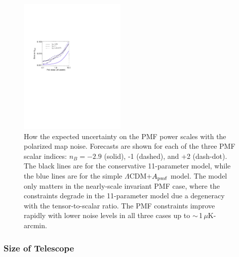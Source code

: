 \documentclass[apj]{emulateapj}
\newcommand{\apmf}{\ensuremath{A_{\rm pmf}}}
\newcommand{\lcdm}{\ensuremath{\Lambda}CDM}
\newcommand{\ukarcmin}{\ensuremath{\mu}K-arcmin}
\begin{document}
\begin{figure}[htb]\centering
\includegraphics[width=0.45\textwidth,clip,trim={1.5cm 12.5cm 11cm 7.5cm}]{pmf_sens.pdf}
  \caption[]{ \label{fig:sensitivity}
  How the expected uncertainty on the PMF power scales with the polarized map noise. 
  Forecasts are shown for each of the three PMF scalar indices: $n_B = -2.9$ (solid), -1 (dashed), and +2 (dash-dot). 
  The black lines are for the conservative 11-parameter model, while the blue lines are for the simple \lcdm{}+\apmf{} model. 
  The model only matters in the nearly-scale invariant PMF case, where the constraints degrade in the 11-parameter model due a degeneracy with the tensor-to-scalar ratio. 
  The PMF constraints improve rapidly with lower noise levels in all three cases up to $\sim$\,1\,\ukarcmin. 
    }
\end{figure}

\subsubsection{Size of Telescope }
\end{document}
